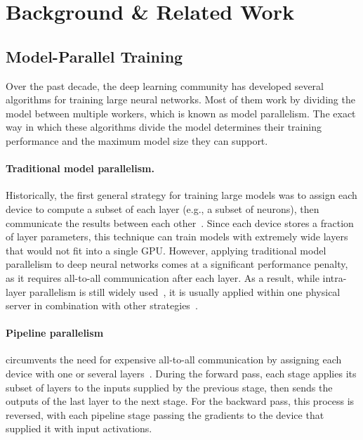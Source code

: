\section{Background \& Related Work}
\subsection{Model-Parallel Training}\label{sect:related_model_parallel}

Over the past decade, the deep learning community has developed several algorithms for training large neural networks. 
Most of them work by dividing the model between multiple workers, which is known as model parallelism. 
The exact way in which these algorithms divide the model determines their training performance and the maximum model size they can support.

\paragraph{Traditional model parallelism.} Historically, the first general strategy for training large models was to assign each device to compute a subset of each layer (e.g., a subset of neurons), then communicate the results between each other~\citep{alexnet,model_parallelism_survey1,model_parallelism_survey2}.
Since each device stores a fraction of layer parameters, this technique can train models with extremely wide layers that would not fit into a single GPU. However, applying traditional model parallelism to deep neural networks comes at a significant performance penalty, as it requires all-to-all communication after each layer.
As a result, while intra-layer parallelism is still widely used~\citep{meshtensorflow,zero}, it is usually applied within one physical server in combination with other strategies~\citep{krizhevsky2014oneweirdtrick,projectadam,beyond_data_and_model,megatron2}.

\vspace{-8pt}
\paragraph{Pipeline parallelism} circumvents the need for expensive all-to-all communication by assigning each device with one or several layers~\citep{huang2019gpipe}. During the forward pass, each stage applies its subset of layers to the inputs supplied by the previous stage, then sends the outputs of the last layer to the next stage. For the backward pass, this process is reversed, with each pipeline stage passing the gradients to the device that supplied it with input activations.

